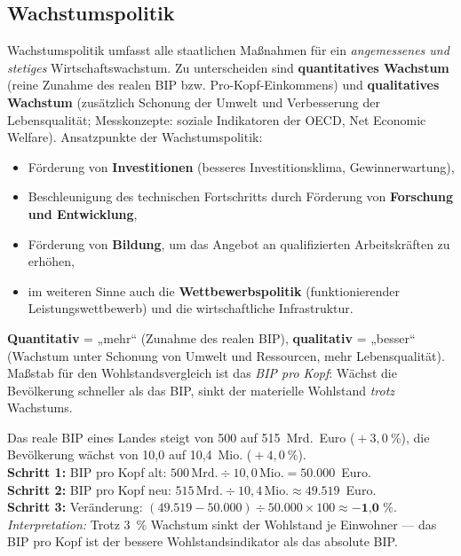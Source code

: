 \documentclass[11pt, a4paper]{article}
\begin{document}
\subsection{Wachstumspolitik}

Wachstumspolitik umfasst alle staatlichen Maßnahmen für ein \emph{angemessenes und
stetiges} Wirtschaftswachstum. Zu unterscheiden sind \textbf{quantitatives Wachstum}
(reine Zunahme des realen BIP bzw. Pro-Kopf-Einkommens) und \textbf{qualitatives Wachstum}
(zusätzlich Schonung der Umwelt und Verbesserung der Lebensqualität; Messkonzepte: soziale
Indikatoren der OECD, Net Economic Welfare). Ansatzpunkte der Wachstumspolitik:

\begin{itemize}
  \item Förderung von \textbf{Investitionen} (besseres Investitionsklima, Gewinnerwartung),
  \item Beschleunigung des technischen Fortschritts durch Förderung von
    \textbf{Forschung und Entwicklung},
  \item Förderung von \textbf{Bildung}, um das Angebot an qualifizierten Arbeitskräften zu
    erhöhen,
  \item im weiteren Sinne auch die \textbf{Wettbewerbspolitik} (funktionierender
    Leistungswettbewerb) und die wirtschaftliche Infrastruktur.
\end{itemize}

\begin{merksatz}
\textbf{Quantitativ} = „mehr`` (Zunahme des realen BIP), \textbf{qualitativ} = „besser``
(Wachstum unter Schonung von Umwelt und Ressourcen, mehr Lebensqualität). Maßstab für den
Wohlstandsvergleich ist das \emph{BIP pro Kopf}: Wächst die Bevölkerung schneller als das
BIP, sinkt der materielle Wohlstand \emph{trotz} Wachstums.
\end{merksatz}

\begin{beispiel}
Das reale BIP eines Landes steigt von 500 auf 515~Mrd.~Euro (${}+3{,}0~\%$), die
Bevölkerung wächst von 10,0 auf 10,4~Mio. (${}+4{,}0~\%$).\\[0.3em]
\textbf{Schritt 1:} BIP pro Kopf alt: $500\,\text{Mrd.} \div 10{,}0\,\text{Mio.}
= 50.000$~Euro.\\
\textbf{Schritt 2:} BIP pro Kopf neu: $515\,\text{Mrd.} \div 10{,}4\,\text{Mio.}
\approx 49.519$~Euro.\\
\textbf{Schritt 3:} Veränderung: $(49.519 - 50.000) \div 50.000 \times 100 \approx
\textbf{$-$1{,}0~\%}$.\\[0.3em]
\emph{Interpretation:} Trotz 3~\% Wachstum sinkt der Wohlstand je Einwohner --- das BIP
pro Kopf ist der bessere Wohlstandsindikator als das absolute BIP.
\end{beispiel}
\end{document}

